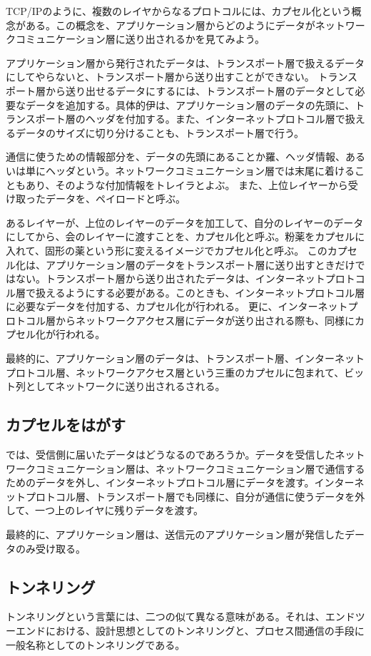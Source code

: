 TCP/IPのように、複数のレイヤからなるプロトコルには、カプセル化という概念がある。この概念を、アプリケーション層からどのようにデータがネットワークコミュニケーション層に送り出されるかを見てみよう。

アプリケーション層から発行されたデータは、トランスポート層で扱えるデータにしてやらないと、トランスポート層から送り出すことができない。
トランスポート層から送り出せるデータにするには、トランスポート層のデータとして必要なデータを追加する。具体的伊は、アプリケーション層のデータの先頭に、トランスポート層のヘッダを付加する。また、インターネットプロトコル層で扱えるデータのサイズに切り分けることも、トランスポート層で行う。

通信に使うための情報部分を、データの先頭にあることか羅、ヘッダ情報、あるいは単にヘッダという。ネットワークコミュニケーション層では末尾に着けることもあり、そのような付加情報をトレイラとよぶ。
また、上位レイヤーから受け取ったデータを、ペイロードと呼ぶ。

あるレイヤーが、上位のレイヤーのデータを加工して、自分のレイヤーのデータにしてから、会のレイヤーに渡すことを、カプセル化と呼ぶ。粉薬をカプセルに入れて、固形の薬という形に変えるイメージでカプセル化と呼ぶ。
このカプセル化は、アプリケーション層のデータをトランスポート層に送り出すときだけではない。トランスポート層から送り出されたデータは、インターネットプロトコル層で扱えるようにする必要がある。このときも、インターネットプロトコル層に必要なデータを付加する、カプセル化が行われる。
更に、インターネットプロトコル層からネットワークアクセス層にデータが送り出される際も、同様にカプセル化が行われる。

最終的に、アプリケーション層のデータは、トランスポート層、インターネットプロトコル層、ネットワークアクセス層という三重のカプセルに包まれて、ビット列としてネットワークに送り出されるされる。

\subsection{カプセルをはがす}
では、受信側に届いたデータはどうなるのであろうか。データを受信したネットワークコミュニケーション層は、ネットワークコミュニケーション層で通信するためのデータを外し、インターネットプロトコル層にデータを渡す。インターネットプロトコル層、トランスポート層でも同様に、自分が通信に使うデータを外して、一つ上のレイヤに残りデータを渡す。

最終的に、アプリケーション層は、送信元のアプリケーション層が発信したデータのみ受け取る。

\subsection{トンネリング}
トンネリングという言葉には、二つの似て異なる意味がある。それは、エンドツーエンドにおける、設計思想としてのトンネリングと、プロセス間通信の手段に一般名称としてのトンネリングである。

